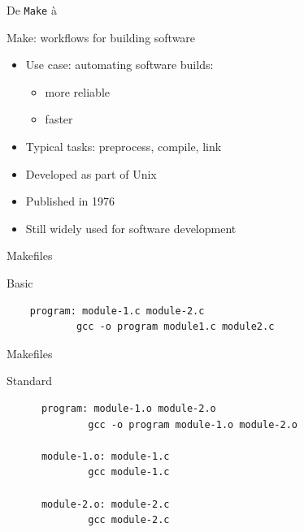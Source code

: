 \documentclass[aspectratio=169]{beamer}
\begin{document}
\begin{frame}{}

  \begin{center}
  \Large De \texttt{Make} à 
  \end{center}

\end{frame}

\begin{frame}{Make: workflows for building software}

  \begin{itemize}
  \item Use case: automating software builds:
    \begin{itemize}
    \item more reliable
    \item faster
    \end{itemize}
  \item Typical tasks: preprocess, compile, link
  \item Developed as part of Unix
  \item Published in 1976
  \item Still widely used for software development
  \end{itemize}

\end{frame}

\begin{frame}[fragile]{Makefiles}

  \begin{block}{Basic}
    \begin{lstlisting}
    program: module-1.c module-2.c
            gcc -o program module1.c module2.c
    \end{lstlisting}
  \end{block}

\end{frame}

\begin{frame}[fragile]{Makefiles}

  \begin{block}{Standard}
    \begin{lstlisting}
      program: module-1.o module-2.o
              gcc -o program module-1.o module-2.o

      module-1.o: module-1.c
              gcc module-1.c

      module-2.o: module-2.c
              gcc module-2.c
    \end{lstlisting}
  \end{block}

\end{frame}
\end{document}
